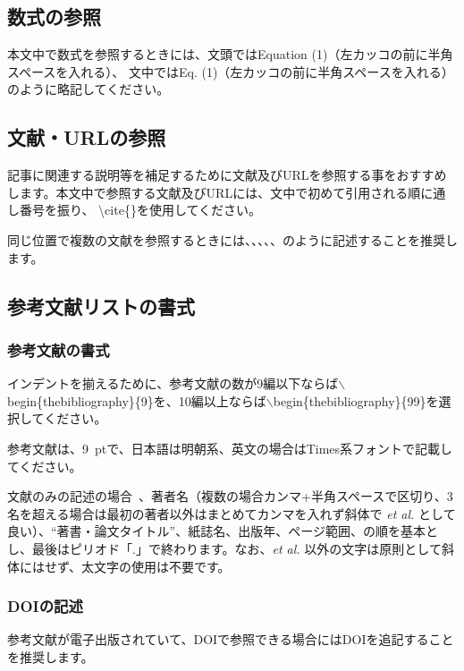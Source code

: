 \documentclass{PASJ2024}
\begin{document}
\subsection{数式の参照}
本文中で数式を参照するときには、文頭ではEquation (1)（左カッコの前に半角スペースを入れる）、
文中ではEq. (1)（左カッコの前に半角スペースを入れる）のように略記してください。
%
\subsection{文献・URLの参照}
記事に関連する説明等を補足するために文献及びURLを参照する事をおすすめします。本文中で参照する文献及びURLには、文中で初めて引用される順に通し番号を振り、 \textbackslash{cite}\{\}を使用してください。

同じ位置で複数の文献を参照するときには、\cite{Reference_JACoW_Word, Reference_JACoW_TeX}、\cite{Reference_JACoW_Word, Reference_JACoW_TeX, Reference_1}、\cite{Reference_JACoW_Word, Reference_JACoW_TeX, Reference_1, T_Tanaka}、\cite{Reference_JACoW_Word, Reference_JACoW_TeX, Reference_1, T_Tanaka, Reference_2}、\cite{Reference_JACoW_Word, Reference_JACoW_TeX, Reference_1, T_Tanaka, Reference_2, mi}のように記述することを推奨します。
%
\subsection{参考文献リストの書式}
\subsubsection{参考文献の書式}
\label{reference_format}
インデントを揃えるために、参考文献の数が9編以下ならば$\backslash$begin\{thebibliography\}\{9\}を、10編以上ならば$\backslash$begin\{thebibliography\}\{99\}を選択してください。

参考文献は、9~ptで、日本語は明朝系、英文の場合はTimes系フォントで記載してください。

文献のみの記述の場合~\cite{Reference_1}、著者名（複数の場合カンマ+半角スペースで区切り、3名を超える場合は最初の著者以外はまとめてカンマを入れず斜体で \textit{et al.} として良い）、``著書・論文タイトル''、紙誌名、出版年、ページ範囲、の順を基本とし、最後はピリオド「.」で終わります。なお、\textit{et al.} 以外の文字は原則として斜体にはせず、太文字の使用は不要です。

\subsubsection{DOIの記述}
参考文献が電子出版されていて、DOIで参照できる場合にはDOIを追記することを推奨します。
\end{document}
